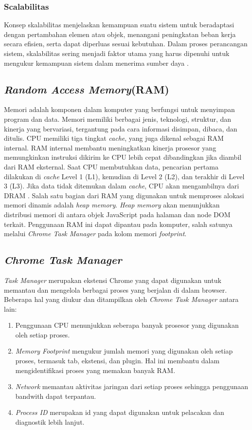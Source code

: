 \subsubsection{Scalabilitas}
Konsep skalabilitas menjelaskan kemampuan suatu sistem untuk beradaptasi dengan pertambahan elemen atau objek, menangani peningkatan beban kerja secara efisien, serta dapat diperluas sesuai kebutuhan. Dalam proses perancangan sistem, skalabilitas sering menjadi faktor utama yang harus dipenuhi untuk mengukur kemampuan sistem dalam menerima sumber daya \cite{Bondi2000}.

\subsection{\textit{Random Access Memory}(RAM)}
Memori adalah komponen dalam komputer yang berfungsi untuk menyimpan program dan data. Memori memiliki berbagai jenis, teknologi, struktur, dan kinerja yang bervariasi, tergantung pada cara informasi disimpan, dibaca, dan ditulis. CPU memiliki tiga tingkat \textit{cache}, yang juga dikenal sebagai RAM internal. RAM internal membantu meningkatkan kinerja prosesor yang memungkinkan instruksi dikirim ke CPU lebih cepat dibandingkan jika diambil dari RAM eksternal. Saat CPU membutuhkan data, pencarian pertama dilakukan di \textit{cache} Level 1 (L1), kemudian di Level 2 (L2), dan terakhir di Level 3 (L3). Jika data tidak ditemukan dalam \textit{cache}, CPU akan mengambilnya dari DRAM \cite{Nurwarsito}. Salah satu bagian dari RAM yang digunakan untuk memproses alokasi memori dinamis adalah \textit{heap memory}. \textit{Heap memory} akan menunjukkan distribusi memori di antara objek JavaScript pada halaman dan node DOM terkait. Penggunaan RAM ini dapat dipantau pada komputer, salah satunya melalui \textit{Chrome Task Manager} pada kolom memori \textit{footprint}. 

\subsection{\textit{Chrome Task Manager}}
\textit{Task Manager} merupakan ekstensi Chrome yang dapat digunakan untuk memantau dan mengelola berbagai proses yang berjalan di dalam browser. Beberapa hal yang diukur dan ditampilkan oleh \textit{Chrome Task Manager} antara lain:
\begin{enumerate}
	\item Penggunaan CPU menunjukkan seberapa banyak prosesor yang digunakan oleh setiap proses. 
	\item \textit{Memory Footprint} mengukur jumlah memori yang digunakan oleh setiap proses, termasuk tab, ekstensi, dan plugin. Hal ini membantu dalam mengidentifikasi proses yang memakan banyak RAM.
	\item \textit{Network} memantau aktivitas jaringan dari setiap proses sehingga penggunaan bandwith dapat terpantau. 
	\item \textit{Process ID} merupakan id yang dapat digunakan untuk pelacakan dan diagnostik lebih lanjut.
\end{enumerate}

